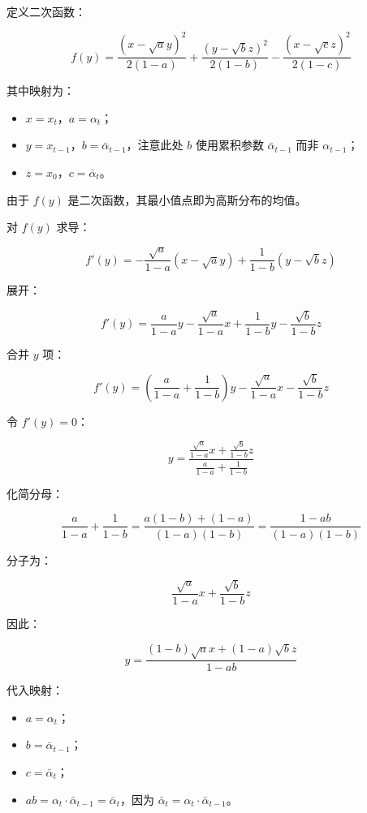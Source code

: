 定义二次函数：

\[
f(y)=
\frac{(x-\sqrt{a}y)^2}{2(1-a)}
+\frac{(y-\sqrt{b}z)^2}{2(1-b)}
-\frac{(x-\sqrt{c}z)^2}{2(1-c)}
\]

其中映射为：

\begin{itemize}
\tightlist
\item
  \(x=x_t\)，\(a=\alpha_t\)；
\item
  \(y=x_{t-1}\)，\(b=\bar{\alpha}_{t-1}\)，注意此处 \(b\) 使用累积参数 \(\bar{\alpha}_{t-1}\) 而非 \(\alpha_{t-1}\)；
\item
  \(z=x_0\)，\(c=\bar{\alpha}_t\)。
\end{itemize}

由于 \(f(y)\) 是二次函数，其最小值点即为高斯分布的均值。

对 \(f(y)\) 求导：

\[
f'(y)=-\frac{\sqrt{a}}{1-a}(x-\sqrt{a}y)+\frac{1}{1-b}(y-\sqrt{b}z)
\]

展开：

\[
f'(y)=\frac{a}{1-a}y-\frac{\sqrt{a}}{1-a}x+\frac{1}{1-b}y-\frac{\sqrt{b}}{1-b}z
\]

合并 \(y\) 项：

\[
f'(y)=\left(\frac{a}{1-a}+\frac{1}{1-b}\right)y-\frac{\sqrt{a}}{1-a}x-\frac{\sqrt{b}}{1-b}z
\]

令 \(f'(y)=0\)：

\[
y=\frac{\frac{\sqrt{a}}{1-a}x+\frac{\sqrt{b}}{1-b}z}{\frac{a}{1-a}+\frac{1}{1-b}}
\]

化简分母：

\[
\frac{a}{1-a}+\frac{1}{1-b}
=\frac{a(1-b)+(1-a)}{(1-a)(1-b)}
=\frac{1-ab}{(1-a)(1-b)}
\]

分子为：

\[
\frac{\sqrt{a}}{1-a}x+\frac{\sqrt{b}}{1-b}z
\]

因此：

\[
y=\frac{(1-b)\sqrt{a}x+(1-a)\sqrt{b}z}{1-ab}
\]

代入映射：

\begin{itemize}
\tightlist
\item
  \(a=\alpha_t\)；
\item
  \(b=\bar{\alpha}_{t-1}\)；
\item
  \(c=\bar{\alpha}_t\)；
\item
  \(ab=\alpha_t\cdot\bar{\alpha}_{t-1}=\bar{\alpha}_t\)，因为 \(\bar{\alpha}_t=\alpha_t\cdot\bar{\alpha}_{t-1}\)。
\end{itemize}

